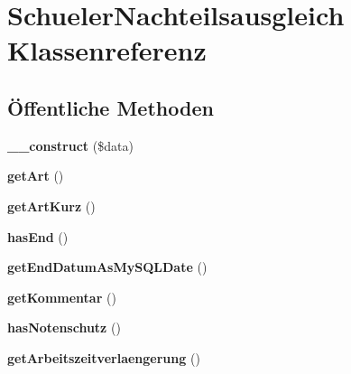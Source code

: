 \hypertarget{class_schueler_nachteilsausgleich}{}\section{Schueler\+Nachteilsausgleich Klassenreferenz}
\label{class_schueler_nachteilsausgleich}
\subsection*{Öffentliche Methoden}
\begin{DoxyCompactItemize}
\item 
\mbox{\label{class_schueler_nachteilsausgleich_a99b47319d3de7f6cfec7ac79d4bf3be5}} 
{\bfseries \+\_\+\+\_\+construct} (\$data)
\item 
\mbox{\label{class_schueler_nachteilsausgleich_acae84bab8af1eea929eb79c7c65da4e4}} 
{\bfseries get\+Art} ()
\item 
\mbox{\label{class_schueler_nachteilsausgleich_a32bbf2e3f6c28837148599de0e3716be}} 
{\bfseries get\+Art\+Kurz} ()
\item 
\mbox{\label{class_schueler_nachteilsausgleich_a1d04db08ae980f1252f4a9c1b086ba00}} 
{\bfseries has\+End} ()
\item 
\mbox{\label{class_schueler_nachteilsausgleich_afa67ff7e65cad9f7be34f6b7ed3e3693}} 
{\bfseries get\+End\+Datum\+As\+My\+S\+Q\+L\+Date} ()
\item 
\mbox{\label{class_schueler_nachteilsausgleich_a3da72421c460f73802ad56c4326d9d7e}} 
{\bfseries get\+Kommentar} ()
\item 
\mbox{\label{class_schueler_nachteilsausgleich_abf5d1c401bd53ce763edf7643504bcd2}} 
{\bfseries has\+Notenschutz} ()
\item 
\mbox{\label{class_schueler_nachteilsausgleich_ac65664249a5d6af4c5c150342d2b7f1c}} 
{\bfseries get\+Arbeitszeitverlaengerung} ()

\end{DoxyCompactItemize}
